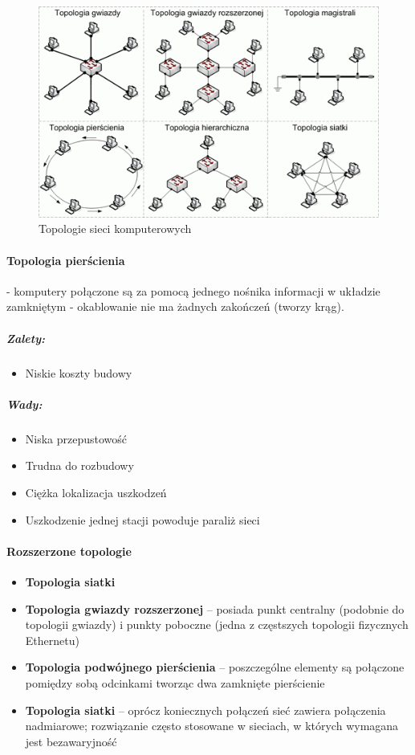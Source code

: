 \documentclass[]{report}
\begin{document}
\begin{figure}[htbp]
\centering
\includegraphics[scale=1]{topologie.png}
\caption{Topologie sieci komputerowych}
\label{rys:topologie_sieci_komp}
\end{figure}

\paragraph{Topologia pierścienia} - komputery połączone są za pomocą jednego nośnika informacji w układzie zamkniętym - okablowanie nie ma żadnych zakończeń (tworzy krąg).
\subparagraph{Zalety:}
\begin{itemize}
\item Niskie koszty budowy
\end{itemize}
\subparagraph{Wady:}
\begin{itemize}
\item Niska przepustowość
\item Trudna do rozbudowy
\item Ciężka lokalizacja uszkodzeń
\item Uszkodzenie jednej stacji powoduje paraliż sieci
\end{itemize}

\paragraph{Rozszerzone topologie}
\begin{itemize}
\item \textbf{Topologia siatki}
\item \textbf{Topologia gwiazdy rozszerzonej} – posiada punkt centralny (podobnie do topologii gwiazdy) i punkty poboczne (jedna z częstszych topologii fizycznych Ethernetu)
\item \textbf{Topologia podwójnego pierścienia} – poszczególne elementy są połączone pomiędzy sobą odcinkami tworząc dwa zamknięte pierścienie
\item \textbf{Topologia siatki} – oprócz koniecznych połączeń sieć zawiera połączenia nadmiarowe; rozwiązanie często stosowane w sieciach, w których wymagana jest bezawaryjność
\end{itemize}
\end{document}
